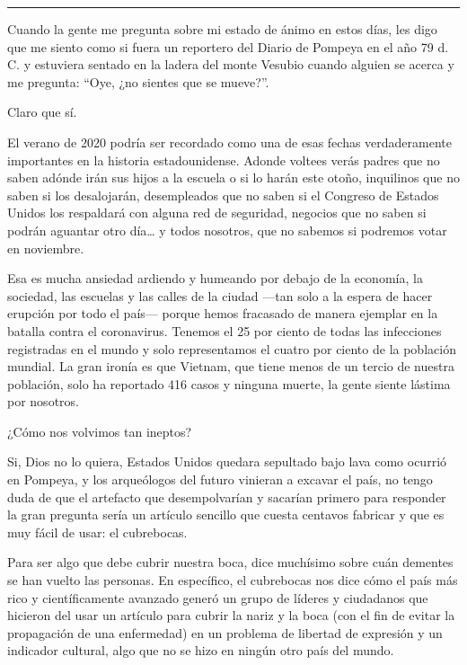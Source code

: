 \begin{center}\rule{0.5\linewidth}{\linethickness}\end{center}

Cuando la gente me pregunta sobre mi estado de ánimo en estos días, les
digo que me siento como si fuera un reportero del Diario de Pompeya en
el año 79 d. C. y estuviera sentado en la ladera del monte Vesubio
cuando alguien se acerca y me pregunta: ``Oye, ¿no sientes que se
mueve?''.

Claro que sí.

El verano de 2020 podría ser recordado como una de esas fechas
verdaderamente importantes en la historia estadounidense. Adonde voltees
verás padres que no saben adónde irán sus hijos a la escuela o si lo
harán este otoño, inquilinos que no saben si los desalojarán,
desempleados que no saben si el Congreso de Estados Unidos los
respaldará con alguna red de seguridad, negocios que no saben si podrán
aguantar otro día\ldots{} y todos nosotros, que no sabemos si podremos
votar en noviembre.

Esa es mucha ansiedad ardiendo y humeando por debajo de la economía, la
sociedad, las escuelas y las calles de la ciudad ---tan solo a la espera
de hacer erupción por todo el país--- porque hemos fracasado de manera
ejemplar en la batalla contra el coronavirus. Tenemos el 25 por ciento
de todas las infecciones registradas en el mundo y solo representamos el
cuatro por ciento de la población mundial. La gran ironía es que
Vietnam, que tiene menos de un tercio de nuestra población, solo ha
reportado 416 casos y ninguna muerte, la gente siente lástima por
nosotros.

¿Cómo nos volvimos tan ineptos?

Si, Dios no lo quiera, Estados Unidos quedara sepultado bajo lava como
ocurrió en Pompeya, y los arqueólogos del futuro vinieran a excavar el
país, no tengo duda de que el artefacto que desempolvarían y sacarían
primero para responder la gran pregunta sería un artículo sencillo que
cuesta centavos fabricar y que es muy fácil de usar: el cubrebocas.

Para ser algo que debe cubrir nuestra boca, dice muchísimo sobre cuán
dementes se han vuelto las personas. En específico, el cubrebocas nos
dice cómo el país más rico y científicamente avanzado generó un grupo de
líderes y ciudadanos que hicieron del usar un artículo para cubrir la
nariz y la boca (con el fin de evitar la propagación de una enfermedad)
en un problema de libertad de expresión y un indicador cultural, algo
que no se hizo en ningún otro país del mundo.

